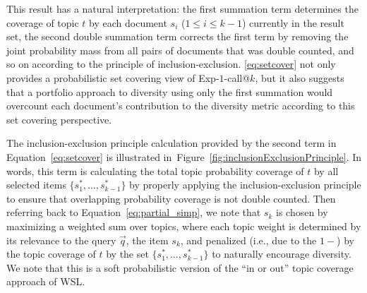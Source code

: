 This result has a natural interpretation: the first summation term
determines the coverage of topic $t$ by each document $s_i$ ($1 \leq i
\leq k-1$) currently in the result set, the second double summation
term corrects the first term by removing the joint probability mass
from all pairs of documents that was double counted, and so on
according to the principle of inclusion-exclusion.
\eqref{eq:setcover} not only provides a probabilistic set covering
view of Exp-$1$-call@$k$, but it also suggests that a portfolio
approach to diversity using only the first summation would overcount
each document's contribution to the diversity metric according to this
set covering perspective.

The inclusion-exclusion principle calculation provided by the second
term in Equation~\ref{eq:setcover} is illustrated
in~Figure~\ref{fig:inclusionExclusionPrinciple}. In words, this term
is calculating the total topic probability coverage of $t$ by all
selected items $\{ s_1^*,\ldots,s_{k-1}^* \}$ by properly applying the
inclusion-exclusion principle to ensure that overlapping probability
coverage is not double counted. Then referring back to
Equation~\ref{eq:partial_simp}, we note that $s_k$ is chosen by
maximizing a weighted sum over topics, where each topic weight is
determined by its relevance to the query $\vec{q}$, the item $s_k$,
and penalized (i.e., due to the $1 - $) by the topic coverage of $t$
by the set $\{ s_1^*,\ldots,s_{k-1}^* \}$ to naturally encourage
diversity.  We note that this is a soft probabilistic version of the
``in or out'' topic coverage approach of WSL.

